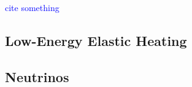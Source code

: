 \documentclass[twocolumn, preprintnumbers,amsmath,amssymb,prd, superscriptaddress]{revtex4}
\newcommand{\GeV}{\text{GeV}}
\newcommand{\MeV}{\text{MeV}}
\def\r{\right)}
\def\l{\left(}
\begin{document}
  


\textcolor{blue}{cite something}

\subsection{Low-Energy Elastic Heating}

\subsection{Neutrinos}

\end{document}
